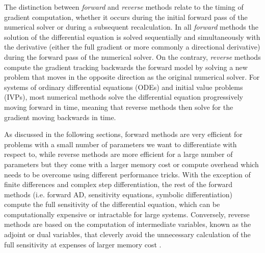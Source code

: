 The distinction between \textit{forward} and \textit{reverse} methods relate to the timing of gradient computation, whether it occurs during the initial forward pass of the numerical solver or during a subsequent recalculation\cite{Griewank:2008kh}. 
In all \textit{forward} methods the solution of the differential equation is solved sequentially and simultaneously with the derivative (either the full gradient or more commonly a directional derivative) during the forward pass of the numerical solver. 
On the contrary, \textit{reverse} methods compute the gradient tracking backwards the forward model by solving a new problem that moves in the opposite direction as the original numerical solver. 
For systems of ordinary differential equations (ODEs) and initial value problems (IVPs), most numerical methods solve the differential equation progressively moving forward in time, meaning that reverse methods then solve for the gradient moving backwards in time. 

As discussed in the following sections, forward methods are very efficient for problems with a small number of parameters we want to differentiate with respect to, while reverse methods are more efficient for a large number of parameters but they come with a larger memory cost or compute overhead which needs to be overcome using different performance tricks. 
With the exception of finite differences and complex step differentiation, the rest of the forward methods (i.e. forward AD, sensitivity equations, symbolic differentiation) compute the full sensitivity of the differential equation, which can be computationally expensive or intractable for large systems. 
Conversely, reverse methods are based on the computation of intermediate variables, known as the adjoint or dual variables, that cleverly avoid the unnecessary calculation of the full sensitivity at expenses of larger memory cost \cite{Givoli_2021}. 


